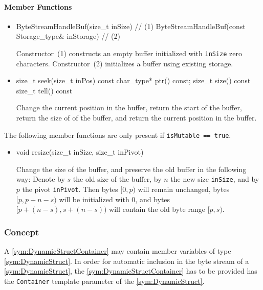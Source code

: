 \paragraph{Member Functions}

\begin{itemize}
	\item
		\begin{cppsnippet}
		ByteStreamHandleBuf(size_t inSize) // (1)
		ByteStreamHandleBuf(const Storage_type& inStorage) // (2)
		\end{cppsnippet}

		Constructor~(1) constructs an empty buffer initialized with \texttt{inSize} zero characters. Constructor~(2) initializes a buffer using existing storage.

	\item
		\begin{cppsnippet}
		size_t seek(size_t inPos)
		const char_type* ptr() const;
		size_t size() const
		size_t tell() const
		\end{cppsnippet}

		Change the current position in the buffer, return the start of the buffer, return the size of of the buffer, and return the current position in the buffer.
\end{itemize}

The following member functions are only present if \texttt{isMutable == true}.
\begin{itemize}
	\item
		\begin{cppsnippet}
		void resize(size_t inSize, size_t inPivot)
		\end{cppsnippet}

		Change the size of the buffer, and preserve the old buffer in the following way: Denote by $s$ the old size of the buffer, by $n$ the new size \texttt{inSize}, and by $p$ the pivot \texttt{inPivot}. Then bytes $[0, p)$ will remain unchanged, bytes $[p, p + n - s)$ will be initialized with 0, and bytes $[p + (n - s), s + (n - s))$ will contain the old byte range $[p, s)$.
\end{itemize}


\subsubsection[Concept DynamicStructContainer]{Concept }

A \ref{sym:DynamicStructContainer} may contain member variables of type \ref{sym:DynamicStruct}. In order for automatic inclusion in the byte stream of a \ref{sym:DynamicStruct}, the \ref{sym:DynamicStructContainer} has to be provided has the \texttt{Container} template parameter of the \ref{sym:DynamicStruct}.

